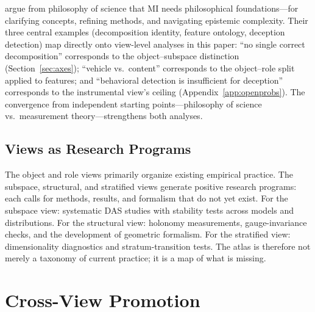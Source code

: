 \documentclass{article}
\begin{document}
\citet{williams2025} argue from philosophy of science that MI needs
philosophical foundations---for clarifying concepts, refining methods,
and navigating epistemic complexity.  Their three central examples
(decomposition identity, feature ontology, deception detection) map
directly onto view-level analyses in this paper: ``no single correct
decomposition'' corresponds to the object--subspace distinction
(Section~\ref{sec:axes}); ``vehicle vs.\ content'' corresponds to the
object--role split applied to features; and ``behavioral detection is
insufficient for deception'' corresponds to the instrumental view's
ceiling (Appendix~\ref{app:openprobs}).  The convergence from
independent starting points---philosophy of science vs.\ measurement
theory---strengthens both analyses.

\subsection{Views as Research Programs}

The object and role views primarily organize existing empirical
practice.  The subspace, structural, and stratified views generate
positive research programs: each calls for methods, results, and
formalism that do not yet exist.  For the subspace view: systematic
DAS studies with stability tests across models and distributions.  For
the structural view: holonomy measurements, gauge-invariance checks,
and the development of geometric formalism.  For the stratified view:
dimensionality diagnostics and stratum-transition tests.  The atlas is
therefore not merely a taxonomy of current practice; it is a map of
what is missing.

\section{Cross-View Promotion}\label{sec:promotion}
\end{document}
